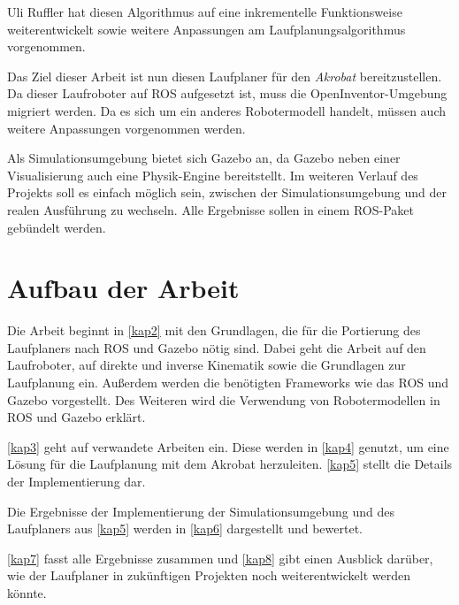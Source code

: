 Uli Ruffler \autocite{ruffler2006} hat diesen Algorithmus auf eine inkrementelle Funktionsweise weiterentwickelt sowie weitere Anpassungen am Laufplanungsalgorithmus vorgenommen.

Das Ziel dieser Arbeit ist nun diesen Laufplaner für den \emph{Akrobat} bereitzustellen. Da dieser Laufroboter auf \ac{ROS} aufgesetzt ist, muss die OpenInventor-Umgebung migriert werden. Da es sich um ein anderes Robotermodell handelt, müssen auch weitere Anpassungen vorgenommen werden.

Als Simulationsumgebung bietet sich Gazebo an, da Gazebo neben einer Visualisierung auch eine Physik-Engine bereitstellt. Im weiteren Verlauf des Projekts soll es einfach möglich sein, zwischen der Simulationsumgebung und der realen Ausführung zu wechseln. Alle Ergebnisse sollen in einem \ac{ROS}-Paket gebündelt werden.

\section{Aufbau der Arbeit}

Die Arbeit beginnt in \autoref{kap2} mit den Grundlagen, die für die Portierung des Laufplaners nach \ac{ROS} und Gazebo nötig sind. Dabei geht die Arbeit auf den Laufroboter, auf direkte und inverse Kinematik sowie die Grundlagen zur Laufplanung ein. Außerdem werden die benötigten Frameworks wie das \ac{ROS} und Gazebo vorgestellt. Des Weiteren wird die Verwendung von Robotermodellen in \ac{ROS} und Gazebo erklärt.

\autoref{kap3} geht auf verwandete Arbeiten ein. Diese werden in \autoref{kap4} genutzt, um eine Lösung für die Laufplanung mit dem Akrobat herzuleiten. \autoref{kap5} stellt die Details der Implementierung dar.

Die Ergebnisse der Implementierung der Simulationsumgebung und des Laufplaners aus \autoref{kap5} werden in \autoref{kap6} dargestellt und bewertet.

\autoref{kap7} fasst alle Ergebnisse zusammen und \autoref{kap8} gibt einen Ausblick darüber, wie der Laufplaner in zukünftigen Projekten noch weiterentwickelt werden könnte.